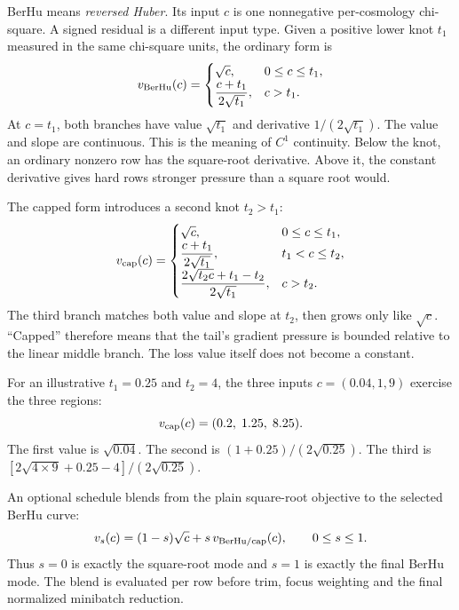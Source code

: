 \documentclass[10pt,aps,prd,twocolumn,nofootinbib]{revtex4-2}
\begin{document}
BerHu means \emph{reversed Huber}.  Its input $c$ is one nonnegative
per-cosmology chi-square.  A signed residual is a different input type.  Given a positive lower knot
$t_1$ measured in the same chi-square units, the ordinary form is
\begin{equation*}
 v_{\rm BerHu}(c)=
 \begin{cases}
   \sqrt{c}, & 0\le c\le t_1,\\
   \dfrac{c+t_1}{2\sqrt{t_1}}, & c>t_1.
 \end{cases}
\end{equation*}
At $c=t_1$, both branches have value $\sqrt{t_1}$ and derivative
$1/(2\sqrt{t_1})$.  The value and slope are continuous.  This is the meaning
of $C^1$ continuity.  Below the knot, an ordinary nonzero row has the
square-root derivative.  Above it, the constant derivative gives hard rows
stronger pressure than a square root would.

The capped form introduces a second knot $t_2>t_1$:
\begin{equation*}
 v_{\rm cap}(c)=
 \begin{cases}
   \sqrt{c}, & 0\le c\le t_1,\\
   \dfrac{c+t_1}{2\sqrt{t_1}}, & t_1<c\le t_2,\\
   \dfrac{2\sqrt{t_2c}+t_1-t_2}{2\sqrt{t_1}}, & c>t_2.
 \end{cases}
\end{equation*}
The third branch matches both value and slope at $t_2$, then grows only like
$\sqrt c$.  ``Capped'' therefore means that the tail's gradient pressure is
bounded relative to the linear middle branch.  The loss value itself does not
become a constant.

For an illustrative $t_1=0.25$ and $t_2=4$, the three inputs
$c=(0.04,1,9)$ exercise the three regions:
\begin{equation*}
 v_{\rm cap}(c)=(0.2,\;1.25,\;8.25).
\end{equation*}
The first value is $\sqrt{0.04}$.  The second is
$(1+0.25)/(2\sqrt{0.25})$.  The third is
$[2\sqrt{4\times9}+0.25-4]/(2\sqrt{0.25})$.

An optional schedule blends from the plain square-root objective to the
selected BerHu curve:
\begin{equation*}
 v_s(c)=(1-s)\sqrt c+s\,v_{\rm BerHu/cap}(c),\qquad 0\le s\le1.
\end{equation*}
Thus $s=0$ is exactly the square-root mode and $s=1$ is exactly the final
BerHu mode.  The blend is evaluated per row before trim, focus weighting and
the final normalized minibatch reduction.
\end{document}
